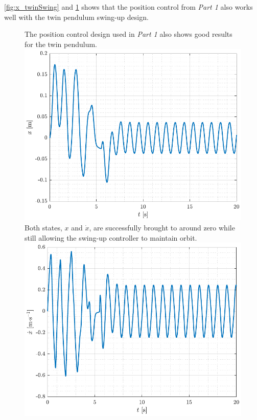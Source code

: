 %
\autoref{fig:x_twinSwing} and \ref{fig:xDot_twinSwing} shows that the position control from \textit{Part 1} also works well with the twin pendulum swing-up design.
\begin{figure}[H]
  \hspace{-10pt}
  \captionbox
  {
    The position control design used in \textit{Part 1} also shows good results for the twin pendulum.
    \label{fig:x_twinSwing}
  }
  {
    \hspace{-1cm}
    \includegraphics[width=.4\textwidth]{figures/x_twinSwing}
  }
  \hspace{20pt}
  \captionbox 
  {
    Both states, $x$ and $\dot{x}$, are successfully brought to around zero while still allowing the swing-up controller to maintain orbit.
    \label{fig:xDot_twinSwing}
  }
  {
    \hspace{-1cm}
    \includegraphics[width=.4\textwidth]{figures/xDot_twinSwing}
  }  
\end{figure}
%
%

